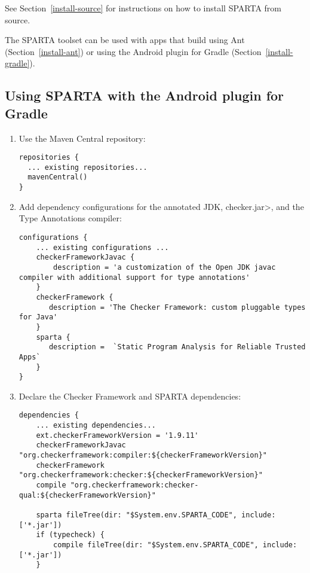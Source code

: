 See Section~\ref{install-source} for instructions on how to install SPARTA from source.

The SPARTA toolset can be used with apps that build using Ant (Section~\ref{install-ant})
or using the Android plugin for Gradle (Section~\ref{install-gradle}).

\subsection{Using SPARTA with the Android plugin for Gradle\label{install-gradle}}
\begin{enumerate}
\item Use the Maven Central repository:

\begin{Verbatim}
repositories {
  ... existing repositories...
  mavenCentral()
}
\end{Verbatim}

\item Add dependency configurations for the annotated JDK, \<checker.jar>, and the Type Annotations compiler:

\begin{small}
\begin{Verbatim}
configurations {
    ... existing configurations ...
    checkerFrameworkJavac {
        description = 'a customization of the Open JDK javac compiler with additional support for type annotations'
    }
    checkerFramework {
       description = 'The Checker Framework: custom pluggable types for Java'
    }
    sparta {
       description =  `Static Program Analysis for Reliable Trusted Apps`
    }
}
\end{Verbatim}
\end{small}

\item Declare the Checker Framework and SPARTA dependencies:

\begin{small}
\begin{Verbatim}
dependencies {
    ... existing dependencies...
    ext.checkerFrameworkVersion = '1.9.11'
    checkerFrameworkJavac "org.checkerframework:compiler:${checkerFrameworkVersion}"
    checkerFramework "org.checkerframework:checker:${checkerFrameworkVersion}"
    compile "org.checkerframework:checker-qual:${checkerFrameworkVersion}"

    sparta fileTree(dir: "$System.env.SPARTA_CODE", include: ['*.jar'])
    if (typecheck) {
        compile fileTree(dir: "$System.env.SPARTA_CODE", include: ['*.jar'])
    }


\end{Verbatim}
\end{small}
\end{enumerate}
